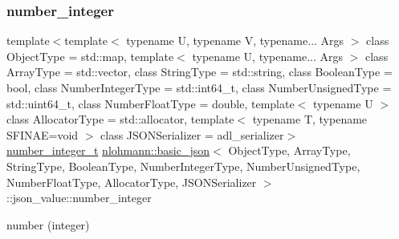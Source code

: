 \subsubsection{\texorpdfstring{number\_integer}{number\_integer}}
{\footnotesize\ttfamily template$<$template$<$ typename U, typename V, typename... Args $>$ class Object\+Type = std\+::map, template$<$ typename U, typename... Args $>$ class Array\+Type = std\+::vector, class String\+Type  = std\+::string, class Boolean\+Type  = bool, class Number\+Integer\+Type  = std\+::int64\+\_\+t, class Number\+Unsigned\+Type  = std\+::uint64\+\_\+t, class Number\+Float\+Type  = double, template$<$ typename U $>$ class Allocator\+Type = std\+::allocator, template$<$ typename T, typename S\+F\+I\+N\+A\+E=void $>$ class J\+S\+O\+N\+Serializer = adl\+\_\+serializer$>$ \\
\mbox{\hyperlink{classnlohmann_1_1basic__json_a98e611d67b7bd75307de99c9358ab2dc}{number\+\_\+integer\+\_\+t}} \mbox{\hyperlink{classnlohmann_1_1basic__json}{nlohmann\+::basic\+\_\+json}}$<$ Object\+Type, Array\+Type, String\+Type, Boolean\+Type, Number\+Integer\+Type, Number\+Unsigned\+Type, Number\+Float\+Type, Allocator\+Type, J\+S\+O\+N\+Serializer $>$\+::json\+\_\+value\+::number\+\_\+integer}



number (integer) 

\mbox{\label{unionnlohmann_1_1basic__json_1_1json__value_a0299a6aa3bc4d45d54130e52970f73d3}} 
